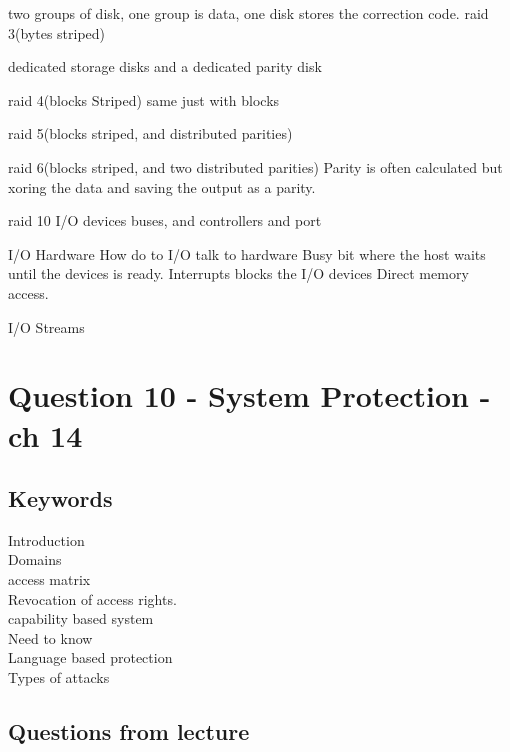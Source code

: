 \documentclass[a4paper,10pt,titlepage]{report}
\begin{document}
\hspace{10mm}	two groups of disk, one group is data, one disk stores the correction code.
\hspace{5mm}	raid 3(bytes striped)
	
\hspace{10mm}		dedicated storage disks and a dedicated parity disk
		
\hspace{5mm}	raid 4(blocks Striped)
\hspace{10mm}	same just with blocks
	
\hspace{5mm}	raid 5(blocks striped, and distributed parities)
	
\hspace{5mm}	raid 6(blocks striped, and two distributed parities)
\hspace{10mm}	Parity is often calculated but xoring the data and saving the output as a parity.
	
	raid 10
I/O devices
	buses, and controllers and port
 
I/O Hardware
	How do to I/O talk to hardware
	Busy bit where the host waits until the devices is ready.
	Interrupts blocks the I/O devices
	Direct memory access.

I/O Streams
	

\section{Question 10 - System Protection - ch 14}



\subsection{Keywords}

Introduction \\
Domains \\
	access matrix \\
Revocation of access rights.\\
capability based system\\
	Need to know \\
Language based protection\\
Types of attacks \\



\subsection{Questions from lecture}
\end{document}
